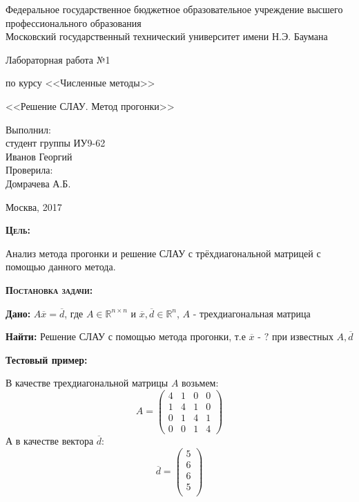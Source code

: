 \documentclass [12pt]{article}
\title{}
\date{}
\author{}
\begin{document}
\begin{titlepage}
\thispagestyle{empty}
\begin{center}
Федеральное государственное бюджетное образовательное учреждение высшего профессионального образования \\Московский государственный технический университет имени Н.Э. Баумана

\end{center}
\vfill
\centerline{\large{Лабораторная работа №1}}
\centerline{\large{по курсу <<Численные методы>>}}
\centerline{\large{<<Решение СЛАУ. Метод прогонки>>}}
\vfill
\hfill\parbox{5cm} {
           Выполнил:\\
           студент группы ИУ9-62 \hfill \\
           Иванов Георгий\hfill \medskip\\
           Проверила:\\
           Домрачева А.Б.\hfill
       }
\centerline{Москва, 2017}
\clearpage
\end{titlepage}

\textsc{\textbf{Цель:}} 

Анализ метода прогонки и решение СЛАУ с трёхдиагональной матрицей с помощью данного метода.

\textsc{\textbf{Постановка задачи:}}

\textbf{Дано:}  
$A\overline{x}=\overline{d}$, где $A \in \mathds{R}^{n \times n}$ и $ \overline{x},\overline{d} \in \mathds{R}^{n}$, $A$ - трехдиагональная матрица

\textbf{Найти:}  Решение СЛАУ с помощью метода прогонки, т.е $\overline{x}$ - $?$ при известных $A, \overline{d}$

\textbf{Тестовый пример:} 

В качестве трехдиагональной матрицы $A$  возьмем: 
$$A = \left(\begin{array}{cccc} 
4 & 1 & 0 & 0 \\
1 & 4 & 1 & 0 \\
0 & 1 & 4 & 1 \\
0 & 0 & 1 & 4  
\end{array}\right) $$
А в качестве вектора $\overline{d}$: 
$$\overline{d} = \left(\begin{array}{c} 
5 \\
6 \\
6 \\
5 \\
\end{array}\right)$$
\end{document}
